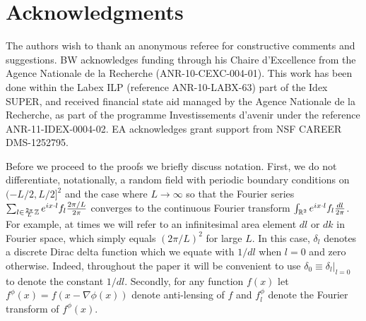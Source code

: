 \documentclass[iop,revtex4,apj,onecolumn]{emulateapj}
\begin{document}
%
%

\section*{Acknowledgments}
The authors wish to thank an anonymous referee for constructive comments and suggestions. 
BW acknowledges funding through his Chaire d'Excellence from the Agence Nationale
de la Recherche (ANR-10-CEXC-004-01). This work has been done within the Labex ILP (reference ANR-10-LABX-63) part of the Idex SUPER, and received financial state aid managed by the Agence Nationale de la Recherche, as part of the programme Investissements d'avenir under the reference ANR-11-IDEX-0004-02. EA acknowledges grant support from NSF CAREER DMS-1252795.




%
%
\appendix


Before we proceed to the proofs we briefly discuss notation.
First, we do not differentiate, notationally, a random field with periodic boundary conditions on $(-L/2, L/2]^2$ and the case where $L\rightarrow \infty$ so that the Fourier series $\sum_{l \in \frac{2\pi}{L}\Bbb Z }   e^{i x\cdot l}  f_l \frac{2\pi/ L}{2\pi} $ converges to the continuous Fourier transform $\int_{\Bbb R^2}  e^{i x\cdot l}  f_l \frac{dl}{2\pi} $. %
For example, at times we will refer to an infinitesimal area element $dl$ or $dk$ in Fourier space, which simply equals $(2\pi / L)^2$ for large $L$. In this case, $\delta_l$ denotes a discrete Dirac delta function which we equate with $1/dl$ when $l=0$ and zero otherwise. Indeed, throughout the paper it will be convenient to use $\delta_0 \equiv \delta_l\bigr|_{l=0}$ to denote the constant $1/dl$.
Secondly, for any function $f(x)$ let $f^\phi(x) = f(x-\nabla \phi(x))$ denote anti-lensing of $f$ and $f^\phi_l$ denote the Fourier transform of  $f^\phi(x)$.
\end{document}
